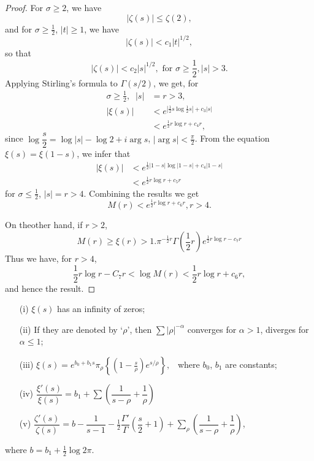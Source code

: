 \begin{proof}
For $\sigma \geq 2$, we have
$$
|\zeta(s)| \leq \zeta(2),
$$
and for $\sigma \geq \frac{1}{2}$, $|t| \geq 1$, we have
$$
|\zeta(s)| < c_1 |t|^{1/2},
$$
so that
$$
|\zeta(s)| < c_2 |s|^{1/2}, \text{ for } \sigma \geq \frac{1}{2}, |s|>3.
$$
Applying Stirling's formula to $\Gamma (s/2)$, we get, for 
\begin{align*}
\sigma \geq \frac{1}{2}, \; \; |s| & = r >3,\\
|\xi (s)| & < e^{|\frac{1}{2} s \log \frac{1}{2}s| + c_3 |s|} \\
& < e^{\frac{1}{2}r \log r + c_4 r},
\end{align*}
since $\log \dfrac{s}{2} = \log|s| - \log 2+i\arg s $, $|\arg s|<
\frac{\pi}{2}$. 
From the equation $\xi(s) = \xi (1-s)$, we infer that
\begin{align*}
|\xi (s)| & < e^{\frac{1}{2} |1-s| \log |1-s| + c_4 |1-s|}\\
& < e^{\frac{1}{2} r \log r+ c_5 r}
\end{align*}
for $\sigma \leq \frac{1}{2}$, $|s| = r >4$. Combining the results we
get
$$
M(r) < e^{\frac{1}{2} r \log r + c_6 r}, r >4.
$$

On the\pageoriginale other hand, if $r>2$,
$$
M(r) \geq \xi (r) > 1. \pi^{-\frac{1}{2} r} \Gamma \left(\frac{1}{2}r \right)
e^{\frac{1}{2} r \log r - c_7 r} 
$$
Thus we have, for $r>4$,
$$
\frac{1}{2} r \log r -C_7 r < \log M(r) < \frac{1}{2} r \log r + c_6 r,
$$
and hence the result.
\end{proof}

\begin{thm}\cite[p.57]{key11}\label{chap13:thm4} 
\begin{itemize}
\item[(i)] $\xi(s)$ has an infinity of zeros;

\item[(ii)] If they are denoted by `$\rho$', then $\sum
  |\rho|^{-\alpha}$ converges for $\alpha>1$, diverges for $\alpha
  \leq 1$;

\item[(iii)] 
$
\xi (s) = e^{b_0 + b_1 s} \pi_{\rho} \left\{ \left(1-\frac{s}{\rho} \right) 
e^{s/\rho}\right\} ,
$ \ where $b_0$, $b_1$ are constants;

\item[(iv)] $\dfrac{\xi'(s)}{\xi(s)} = b_1 + \sum
  \left(\dfrac{1}{s-\rho} + \dfrac{1}{\rho}\right)$ 

\item[(v)] $\dfrac{\zeta'(s)}{\zeta(s)} = b - \dfrac{1}{s-1} -
  \frac{1}{2} \dfrac{\Gamma'}{\Gamma} \left(\dfrac{s}{2}+1 \right)+
  \sum\limits_\rho \left(\dfrac{1}{s-\rho} + \dfrac{1}{\rho} \right)$,   
\end{itemize}
where  $b=b_1 + \frac{1}{2} \log 2 \pi$.
\end{thm}

